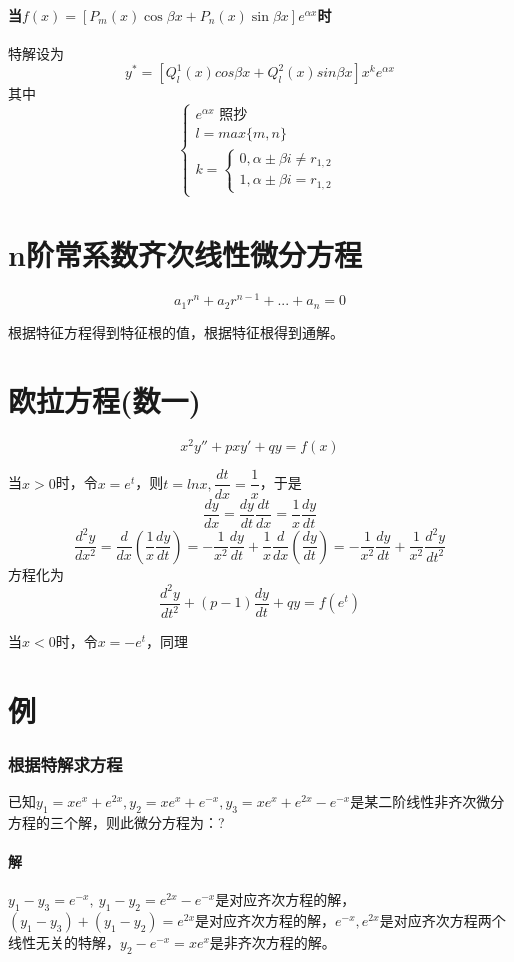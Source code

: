 \paragraph{当\(f(x) = [P_m(x)\cos\beta x + P_n(x)\sin\beta x]e^{\alpha x}\)时}
特解设为
\[y^* = [Q_l^1(x)cos\beta x + Q_l^2(x)sin\beta x]x^ke^{\alpha x}\]
其中
\[\begin{cases}
    e^{\alpha x}\text{ 照抄} \\ 
    l = max\{m, n\} \\ 
    k = \begin{cases}
        0, \alpha \pm \beta i \neq r_{1,2} \\ 
        1, \alpha \pm \beta i = r_{1,2}
    \end{cases}
\end{cases}\]


\section{n阶常系数齐次线性微分方程}
\[a_1r^n + a_2r^{n - 1} + ... + a_n = 0\]

根据特征方程得到特征根的值，根据特征根得到通解。


\section{欧拉方程(数一)}
\[x^2y'' + pxy' + qy = f(x)\]

当\(x > 0\)时，令\(x = e^t\)，则\(t = lnx, \dfrac{dt}{dx} = \dfrac{1}{x}\)，于是
\[\dfrac{dy}{dx} = \dfrac{dy}{dt} \dfrac{dt}{dx} = \dfrac{1}{x} \dfrac{dy}{dt}\]
\[\dfrac{d^2y}{dx^2} = \dfrac{d}{dx}(\dfrac{1}{x}\dfrac{dy}{dt}) = -\dfrac{1}{x^2}\dfrac{dy}{dt} + \dfrac{1}{x}\dfrac{d}{dx}(\dfrac{dy}{dt}) = -\dfrac{1}{x^2}\dfrac{dy}{dt} + \dfrac{1}{x^2}\dfrac{d^2y}{dt^2}\]
方程化为\[\dfrac{d^2y}{dt^2} + (p - 1)\dfrac{dy}{dt} + qy = f(e^t)\]

当\(x < 0\)时，令\(x = -e^t\)，同理


\section{例}

\subsubsection{根据特解求方程}
已知\(y_1 = xe^x + e^{2x}, y_2 = xe^x + e^{-x}, y_3 = xe^x + e^{2x} - e^{-x}\)是某二阶线性非齐次微分方程的三个解，则此微分方程为：?
\paragraph{解}
\(y_1 - y_3 = e^{-x},\ y_1 - y_2 = e^{2x} - e^{-x}\)是对应齐次方程的解，\((y_1 - y_3) + (y_1 - y_2) = e^{2x}\)是对应齐次方程的解，\(e^{-x}, e^{2x}\)是对应齐次方程两个线性无关的特解，\(y_2 - e^{-x} = xe^x\)是非齐次方程的解。

